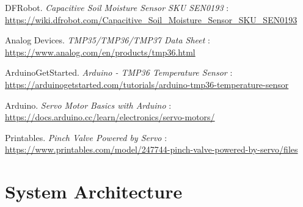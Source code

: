 \documentclass[a4paper,11pt]{article}
\begin{document}
\newpage
\begin{thebibliography}{9}

DFRobot. \textit{Capacitive Soil Moisture Sensor SKU SEN0193} : \\
\url{https://wiki.dfrobot.com/Capacitive_Soil_Moisture_Sensor_SKU_SEN0193}

Analog Devices. \textit{TMP35/TMP36/TMP37 Data Sheet} : \\
\url{https://www.analog.com/en/products/tmp36.html} 

ArduinoGetStarted. \textit{Arduino - TMP36 Temperature Sensor} : \\
\url{https://arduinogetstarted.com/tutorials/arduino-tmp36-temperature-sensor}

Arduino. \textit{Servo Motor Basics with Arduino} : \\
\url{https://docs.arduino.cc/learn/electronics/servo-motors/}

Printables. \textit{Pinch Valve Powered by Servo} : \\
\url{https://www.printables.com/model/247744-pinch-valve-powered-by-servo/files}

\end{thebibliography}

\newpage
\appendix

\section{System Architecture}

\begin{table}[H]
    \centering
    \renewcommand{\arraystretch}{1.5} 
    \caption{Component Order Summary}
    \label{tab:component_order}
\end{table}
\end{document}

